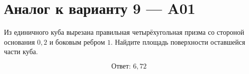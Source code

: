 \documentclass[12pt,a4paper]{article}
\begin{document}
\section*{Аналог к варианту 9 — A01}

Из единичного куба вырезана правильная четырёхугольная призма со стороной основания \(0{,}2\) и боковым ребром \(1\). Найдите площадь поверхности оставшейся части куба.

\begin{center}
\end{center}

\[
\boxed{\text{Ответ: }6{,}72}
\]
\end{document}
